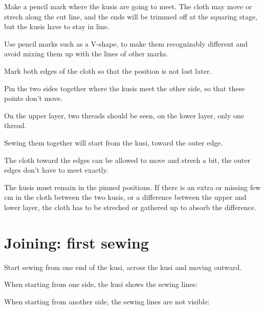 Make a pencil mark where the kusis are going to meet. The cloth may move
or strech along the cut line, and the ends will be trimmed off at the
squaring stage, but the kusis have to stay in line.

Use pencil marks such as a V-shape, to make them recognizably different
and avoid mixing them up with the lines of other marks.

Mark both edges of the cloth so that the position is not lost later.


Pin the two sides together where the kusis meet the other side, so that
these points don't move.

On the upper layer, two threads should be seen, on the lower layer, only
one thread.



Sewing them together will start from the kusi, toward the outer edge.

The cloth toward the edges can be allowed to move and strech a bit, the
outer edges don't have to meet exactly.

The kusis must remain in the pinned positions. If there is an extra or
missing few cm in the cloth between the two kusis, or a difference
between the upper and lower layer, the cloth has to be streched or
gathered up to absorb the difference.

\clearpage

\section{Joining: first sewing}

Start sewing from one end of the kusi, across the kusi and moving
outward.

When starting from one side, the kusi shows the sewing lines:


When starting from another side, the sewing lines are not visible:




